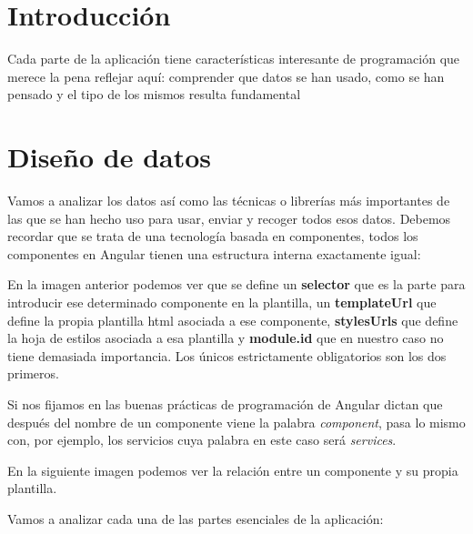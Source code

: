 \section{Introducción}\label{introducciondiseno}
Cada parte de la aplicación tiene características interesante de programación que merece la pena reflejar aquí: comprender que datos se han usado, como se han pensado y el tipo de los mismos resulta fundamental 

\section{Diseño de datos}\label{datos}
Vamos a analizar los datos así como las técnicas o librerías más importantes de las que se han hecho uso para usar, enviar y recoger todos esos datos. Debemos recordar que se trata de una tecnología basada en componentes, todos los componentes en Angular tienen una estructura interna exactamente igual:


En la imagen anterior podemos ver que se define un \textbf{selector} que es la parte para introducir ese determinado componente en la plantilla, un \textbf{templateUrl} que define la propia plantilla html asociada a ese componente, \textbf{stylesUrls} que define la hoja de estilos asociada a esa plantilla y \textbf{module.id} que en nuestro caso no tiene demasiada importancia.  Los únicos estrictamente obligatorios son los dos primeros.

Si nos fijamos en las buenas prácticas de programación de Angular dictan que después del nombre de un componente viene la palabra \emph{component}, pasa lo mismo con, por ejemplo, los servicios cuya palabra en este caso será \emph{services}.

En la siguiente imagen podemos ver la relación entre un componente y su propia plantilla.



Vamos a analizar cada una de las partes esenciales de la aplicación:


